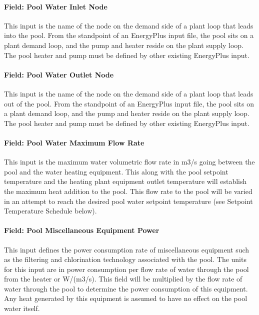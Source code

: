 \paragraph{Field: Pool Water Inlet Node}\label{field-pool-water-inlet-node}

This input is the name of the node on the demand side of a plant loop that leads into the pool. From the standpoint of an EnergyPlus input file, the pool sits on a plant demand loop, and the pump and heater reside on the plant supply loop. The pool heater and pump must be defined by other existing EnergyPlus input.

\paragraph{Field: Pool Water Outlet Node}\label{field-pool-water-outlet-node}

This input is the name of the node on the demand side of a plant loop that leads out of the pool. From the standpoint of an EnergyPlus input file, the pool sits on a plant demand loop, and the pump and heater reside on the plant supply loop. The pool heater and pump must be defined by other existing EnergyPlus input.

\paragraph{Field: Pool Water Maximum Flow Rate}\label{field-pool-water-maximum-flow-rate}

This input is the maximum water volumetric flow rate in m3/s going between the pool and the water heating equipment. This along with the pool setpoint temperature and the heating plant equipment outlet temperature will establish the maximum heat addition to the pool. This flow rate to the pool will be varied in an attempt to reach the desired pool water setpoint temperature (see Setpoint Temperature Schedule below).

\paragraph{Field: Pool Miscellaneous Equipment Power}\label{field-pool-miscellaneous-equipment-power}

This input defines the power consumption rate of miscellaneous equipment such as the filtering and chlorination technology associated with the pool. The units for this input are in power consumption per flow rate of water through the pool from the heater or W/(m3/s). This field will be multiplied by the flow rate of water through the pool to determine the power consumption of this equipment. Any heat generated by this equipment is assumed to have no effect on the pool water itself.


